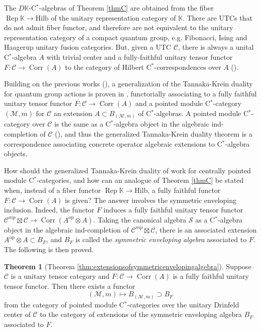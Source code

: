 \documentclass[a4paper,11pt,reqno]{amsart}
\numberwithin{equation}{section}
\theoremstyle{remark}
\theoremstyle{definition}
\newtheorem{theoremAlph}{Theorem}
\newcommand{\bK}{\mathbb K}
\newcommand{\cC}{\mathcal C}
\newcommand{\cM}{\mathcal M}
\newcommand{\cS}{\mathcal S}
\DeclareMathOperator{\Rep}{Rep}
\DeclareMathOperator{\Corr}{Corr}
\newcommand\op{\text{op}}
\newcommand{\Hilb}{\mathrm{Hilb}}
\begin{document}
The $D\bK$-C$^*$-algebras of Theorem \ref{thmC} are obtained from the fiber $\Rep \bK \to \Hilb$ of the unitary representation category of $\bK$. There are UTCs that do not admit fiber functor, and therefore are not equivalent to the unitary representation category of a compact quantum group, e.g. Fibonacci, Ising and Haagerup unitary fusion categories. But, given a UTC $\cC$, there is always a unital C$^*$-algebra $A$ with trivial center and a fully-faithful unitary tensor functor $F:\cC \to \Corr(A)$ to the category of Hilbert C$^*$-correspondences over $A$ (\cites{MR4139893,kitamura2024actions}). 

Building on the previous works (\cites{MR3948170,palomares2023discrete}), a generalization of the Tannaka-Krein duality for quantum group actions is proven in \cite{Hataishi_Palomares_2025}, functorially associating to a fully faithful unitary tensor functor $F:\cC \to \Corr(A)$ and a pointed module C$^*$-category $(\cM,m)$ for $\cC$ an extension $A \subset B_{(\cM,m)}$ of C$^*$-algebras. A pointed module C$^*$-category over $\cC$ is the same as a C$^*$-algebra object in the algebraic ind-completion of $\cC$ (\cite{MR3687214}), and thus the generalized Tannaka-Krein duality theorem is a correspondence associating concrete operator algebraic extensions to C$^*$-algebra objects.

How should the generalized Tannaka-Krein duality of \cite{Hataishi_Palomares_2025} work for centrally pointed module C$^*$-categories, and how can an analogue of Theorem \ref{thmC} be stated when, instead of a fiber functor $\Rep \bK \to \Hilb$, a fully faithful functor $F:\cC \to \Corr(A)$ is given? The answer involves the symmetric enveloping inclusion. Indeed, the functor $F$ induces a fully faithful unitary tensor functor $ \cC^{mp} \boxtimes \cC \to \Corr(A^{\op} \otimes A)$. Taking the canonical algebra $\cS$ as a C$^*$-algebra object in the algebraic ind-completion of $\cC^{mp} \boxtimes \cC$, there is an associated extension $A^{\op} \otimes A \subset B_F$, and $B_F$ is called the {\em symmetric enveloping algebra} associated to $F$. The following is then proved.

\begin{theoremAlph}[Theorem \ref{thm:extensionsofsymmetricenvelopingalgebra}]
	Suppose $\cC$ is a unitary tensor category and $F: \cC \to \Corr(A)$ is a fully faithful unitary tensor functor. Then there exists a functor 
	\[(\cM,m) \mapsto B_{(\cM,m)} \supset B_F \]
	from the category of pointed module C$^*$-categories over the unitary Drinfeld center of $\cC$ to the category of extensions of the symmetric enveloping algebra $B_F$ associated to $F$.
	\label{thmD}
\end{theoremAlph}
\end{document}
